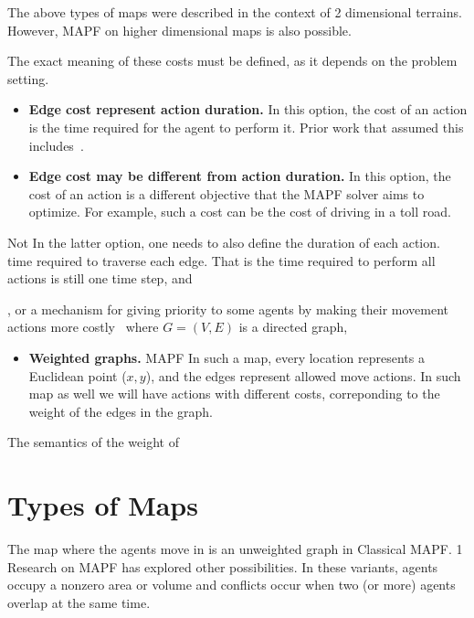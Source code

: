 The above types of maps were described in the context of 2 dimensional terrains. However, MAPF on higher dimensional maps is also possible. 


The exact meaning of these costs must be defined, as it depends on the problem setting. 
\begin{itemize}
	\item \textbf{Edge cost represent action duration.} In this option, 
	the cost of an action is the time required for the agent to perform it. 
	Prior work that assumed this includes~\cite{bartak2018aScheduling,walker2018extended}. 
    \item \textbf{Edge cost may be different from action duration.}  In this option, 
    the cost of an action is a different objective that the MAPF solver aims to optimize. 
    For example, such a cost can be the cost of driving in a toll road.
\end{itemize}
Not
In the latter option, one needs to also define the duration of each action. time required to traverse each edge. 
That is 
the time required to perform all actions is still one time step, and 

, or a mechanism for 
    giving priority to some agents by making their movement actions more costly~\cite{bartak2017modeling}
where $G=(V,E)$ is a directed graph,


\begin{itemize}
    \item \textbf{Weighted graphs.} MAPF
    In such a map, every location represents a Euclidean point ($x,y$), and the edges represent allowed move actions. In such map as well we will have actions with different costs, correponding to the weight of the edges in the graph.
\end{itemize}





The semantics of the weight of 


\section{Types of Maps}
The map where the agents move in is an unweighted graph in Classical MAPF. 1
Research on MAPF has explored other possibilities. In these variants, agents occupy a nonzero area or volume and conflicts occur when two (or more) agents overlap at the same time. 

